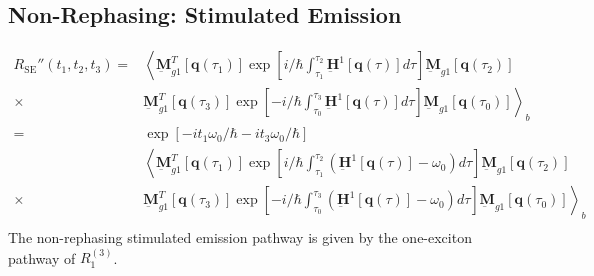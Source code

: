 \documentclass{article}
\newcommand{\bra}[1]{\ensuremath{\left\langle#1\right|}}
\newcommand{\ket}[1]{\ensuremath{\left|#1\right\rangle}}
\newcommand{\vect}[1]{\ensuremath{\boldsymbol{\mathbf{#1}}}}
\newcommand{\arw}{-{Latex[length=2mm]}}
\begin{document}
\subsection{Non-Rephasing: Stimulated Emission}
\begin{figure}[h]
\centering
{}
\end{figure}
\begin{equation}
\begin{split}
 R_\mathrm{SE}''(t_{1},t_{2},t_{3})=&\left\langle\underbar{\vect{M}}_{g1}^{T}[\vect q(\tau_{1})]\exp\left[i/\hbar\int_{\tau_{1}}^{\tau_{2}}\underbar{\vect{H}}^{1}[\vect q(\tau)]d\tau\right] \underbar{\vect{M}}_{g1} [\vect q(\tau_{2})]\right.\\
 \times&\left.\underbar{\vect{M}}_{g1}^{T}[\vect q(\tau_{3})]\exp\left[-i/\hbar\int_{\tau_{0}}^{\tau_{3}}\underbar{\vect{H}}^{1}[\vect q(\tau)]d\tau\right] \underbar{\vect{M}}_{g1} [\vect q(\tau_{0})]\right\rangle_{b}\\
 =&\exp\left[-i t_{1}\omega_{0}/\hbar-it_{3}\omega_{0}/\hbar\right]\\
 &\left\langle\underbar{\vect{M}}_{g1}^{T}[\vect q(\tau_{1})]\exp\left[i/\hbar\int_{\tau_{1}}^{\tau_{2}}\left(\underbar{\vect{H}}^{1}[\vect q(\tau)]-\omega_{0}\right)d\tau\right] \underbar{\vect{M}}_{g1} [\vect q(\tau_{2})]\right.\\
 \times&\left.\underbar{\vect{M}}_{g1}^{T}[\vect q(\tau_{3})]\exp\left[-i/\hbar\int_{\tau_{0}}^{\tau_{3}}\left(\underbar{\vect{H}}^{1}[\vect q(\tau)]-\omega_{0}\right)d\tau\right] \underbar{\vect{M}}_{g1} [\vect q(\tau_{0})]\right\rangle_{b}\\
\end{split}
\end{equation}
The non-rephasing stimulated emission pathway is given by the one-exciton pathway of $R_{1}^{(3)}$.

\clearpage
\end{document}
